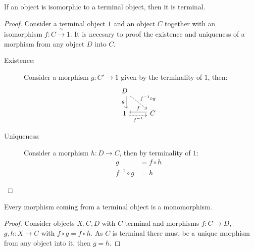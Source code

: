 \begin{theorem}\label{thm:iso_then_terminal}
  If an object is isomorphic to a terminal object, then it is terminal.

  \begin{proof}
    Consider a terminal object $1$ and an object $C$ together with an
    isomorphism $f:C\overset{\cong}{\to} 1$. It is necesary to proof the existence and uniqueness of a morphism from any object $D$ into $C$.

    \begin{description}
      \item[Existence:]
        Consider a morphism $g:C'\to 1$ given by the terminality of $1$, then:
        \[\begin{tikzcd}[ampersand replacement=\&]
          D \\
          1 \& C
          \arrow["f"', shift right=1, from=2-2, to=2-1]
          \arrow["{f^{-1}}"', shift right=1, dashed, from=2-1, to=2-2]
          \arrow["g"', shift left=1, from=1-1, to=2-1]
          \arrow["{f^{-1}\circ g}", dashed, from=1-1, to=2-2]
        \end{tikzcd}\]
        \vspace{-\baselineskip}
      \item[Uniqueness:]
        Consider a morphism $h:D \to C$, then by terminality of $1$:
        \[
          \begin{aligned}
            g &= f \circ h\\
            f^{-1} \circ g &= h
          \end{aligned}
        \]
    \end{description}
  \end{proof}
  \vspace{-1\baselineskip}
\end{theorem}

\begin{theorem}\label{thm:terminal_object_mono}
  Every morphism coming from a terminal object is a monomorphism.

  \begin{proof}
    Consider objects $X,C,D$ with $C$ terminal and morphisms $f:C\to D$,
    $g,h:X\to C$ with $f\circ g = f\circ h$. As $C$ is terminal there must be a
    unique morphism from any object into it, then $g=h$.
  \end{proof}
\end{theorem}

